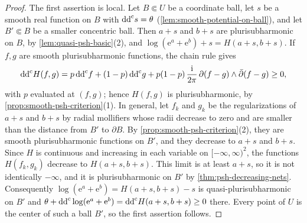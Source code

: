 \begin{proof}
The first assertion is local. Let $B\Subset U$ be a coordinate ball, let $s$ be a smooth real function on $B$ with $\mathrm{dd}^{\mathrm{c}} s=\theta$ (\cref{lem:smooth-potential-on-ball}), and let $B'\Subset B$ be a smaller concentric ball. Then $a+s$ and $b+s$ are plurisubharmonic on $B$, by \cref{lem:quasi-psh-basic}(2), and $\log(\mathrm e^a+\mathrm e^b)+s=H(a+s,b+s)$. If $f,g$ are smooth plurisubharmonic functions, the chain rule gives
\[
 \mathrm{dd}^{\mathrm{c}} H(f,g)=p\,\mathrm{dd}^{\mathrm{c}} f+(1-p)\,\mathrm{dd}^{\mathrm{c}} g
      +p(1-p)\,\frac{\mathrm i}{2\pi}\,\partial(f-g)\wedge\bar\partial(f-g)\geq0,
\]
with $p$ evaluated at $(f,g)$; hence $H(f,g)$ is plurisubharmonic, by \cref{prop:smooth-psh-criterion}(1). In general, let $f_k$ and $g_k$ be the regularizations of $a+s$ and $b+s$ by radial mollifiers whose radii decrease to zero and are smaller than the distance from $B'$ to $\partial B$. By \cref{prop:smooth-psh-criterion}(2), they are smooth plurisubharmonic functions on $B'$, and they decrease to $a+s$ and $b+s$. Since $H$ is continuous and increasing in each variable on $[-\infty,\infty)^2$, the functions $H(f_k,g_k)$ decrease to $H(a+s,b+s)$. This limit is at least $a+s$, so it is not identically $-\infty$, and it is plurisubharmonic on $B'$ by \cref{thm:psh-decreasing-nets}. Consequently $\log(\mathrm e^a+\mathrm e^b)=H(a+s,b+s)-s$ is quasi-plurisubharmonic on $B'$ and $\theta+\mathrm{dd}^{\mathrm{c}}\log(\mathrm e^a+\mathrm e^b)=\mathrm{dd}^{\mathrm{c}} H(a+s,b+s)\geq0$ there. Every point of $U$ is the center of such a ball $B'$, so the first assertion follows.
\end{proof}

